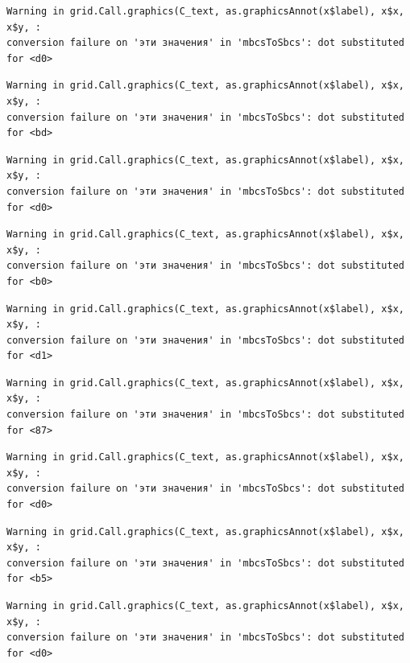 \documentclass[
  letterpaper,
  DIV=11,
  numbers=noendperiod]{scrreprt}
\theoremstyle{definition}
\theoremstyle{remark}
\begin{document}
\begin{verbatim}
Warning in grid.Call.graphics(C_text, as.graphicsAnnot(x$label), x$x, x$y, :
conversion failure on 'эти значения' in 'mbcsToSbcs': dot substituted for <d0>
\end{verbatim}

\begin{verbatim}
Warning in grid.Call.graphics(C_text, as.graphicsAnnot(x$label), x$x, x$y, :
conversion failure on 'эти значения' in 'mbcsToSbcs': dot substituted for <bd>
\end{verbatim}

\begin{verbatim}
Warning in grid.Call.graphics(C_text, as.graphicsAnnot(x$label), x$x, x$y, :
conversion failure on 'эти значения' in 'mbcsToSbcs': dot substituted for <d0>
\end{verbatim}

\begin{verbatim}
Warning in grid.Call.graphics(C_text, as.graphicsAnnot(x$label), x$x, x$y, :
conversion failure on 'эти значения' in 'mbcsToSbcs': dot substituted for <b0>
\end{verbatim}

\begin{verbatim}
Warning in grid.Call.graphics(C_text, as.graphicsAnnot(x$label), x$x, x$y, :
conversion failure on 'эти значения' in 'mbcsToSbcs': dot substituted for <d1>
\end{verbatim}

\begin{verbatim}
Warning in grid.Call.graphics(C_text, as.graphicsAnnot(x$label), x$x, x$y, :
conversion failure on 'эти значения' in 'mbcsToSbcs': dot substituted for <87>
\end{verbatim}

\begin{verbatim}
Warning in grid.Call.graphics(C_text, as.graphicsAnnot(x$label), x$x, x$y, :
conversion failure on 'эти значения' in 'mbcsToSbcs': dot substituted for <d0>
\end{verbatim}

\begin{verbatim}
Warning in grid.Call.graphics(C_text, as.graphicsAnnot(x$label), x$x, x$y, :
conversion failure on 'эти значения' in 'mbcsToSbcs': dot substituted for <b5>
\end{verbatim}

\begin{verbatim}
Warning in grid.Call.graphics(C_text, as.graphicsAnnot(x$label), x$x, x$y, :
conversion failure on 'эти значения' in 'mbcsToSbcs': dot substituted for <d0>
\end{verbatim}
\end{document}
